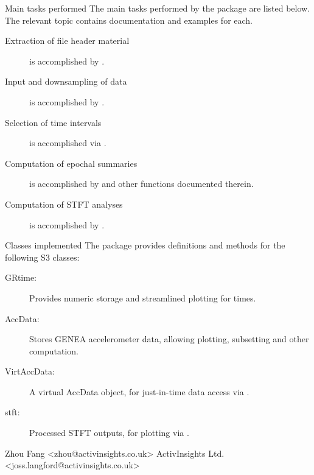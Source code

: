 \documentclass[a4paper]{book}
\begin{document}
%
\begin{Section}{Main tasks performed}
The main tasks performed by the package are listed below. The relevant topic contains documentation and examples for each.
\begin{description}

\item[Extraction of file header material] is accomplished by .
\item[Input and downsampling of data] is accomplished by .

\item[Selection of time intervals] is accomplished via .
\item[Computation of epochal summaries] is accomplished by  and other functions documented therein.
\item[Computation of STFT analyses] is accomplished by .

\end{description}

\end{Section}
%
\begin{Section}{Classes implemented}
The package provides definitions and methods for the following S3 classes:
\begin{description}

\item[GRtime:] Provides numeric storage and streamlined plotting for times. 
\item[AccData:] Stores GENEA accelerometer data, allowing plotting, subsetting and other computation. 
\item[VirtAccData:] A virtual AccData object, for just-in-time data access via .
\item[stft:] Processed STFT outputs, for plotting via .

\end{description}

\end{Section}
%
\begin{Author}\relax
Zhou Fang <zhou@activinsights.co.uk>
ActivInsights Ltd. <joss.langford@activinsights.co.uk>
\end{Author}
\end{document}
